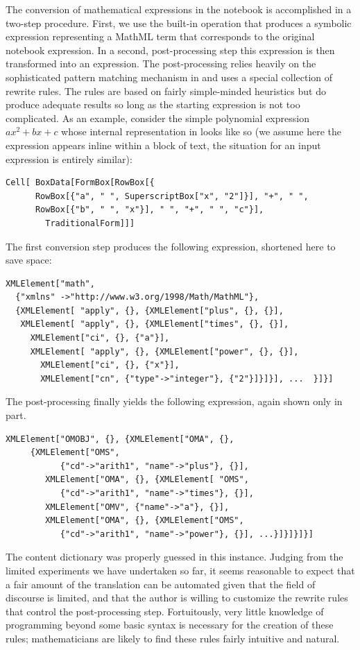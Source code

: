 The conversion of mathematical expressions in the notebook is accomplished in a two-step
procedure.  First, we use the built-in {\mathematica} operation
{} that produces a symbolic expression representing a
MathML term that corresponds to the original notebook expression.  In a second,
post-processing step this expression is then transformed into an {\openmath} expression.
The post-processing relies heavily on the sophisticated pattern matching mechanism in
{\mathematica} and uses a special collection of rewrite rules.  The rules are based on
fairly simple-minded heuristics but do produce adequate results so long as the starting
expression is not too complicated.  As an example, consider the simple polynomial
expression $a x^2 + b x + c$ whose internal representation in {\mathematica} looks like so
(we assume here the expression appears inline within a block of text, the situation for an
input expression is entirely similar):
\begin{lstlisting}
Cell[ BoxData[FormBox[RowBox[{ 
      RowBox[{"a", " ", SuperscriptBox["x", "2"]}], "+", " ", 
      RowBox[{"b", " ", "x"}], " ", "+", " ", "c"}], 
        TraditionalForm]]]
\end{lstlisting}
The first conversion step produces the following {\mathematica} expression, 
shortened here to save space:
\begin{lstlisting}
XMLElement["math", 
  {"xmlns" ->"http://www.w3.org/1998/Math/MathML"}, 
  {XMLElement[ "apply", {}, {XMLElement["plus", {}, {}], 
   XMLElement[ "apply", {}, {XMLElement["times", {}, {}], 
     XMLElement["ci", {}, {"a"}], 
     XMLElement[ "apply", {}, {XMLElement["power", {}, {}], 
       XMLElement["ci", {}, {"x"}], 
       XMLElement["cn", {"type"->"integer"}, {"2"}]}]}], ...  }]}]
\end{lstlisting}
The post-processing finally yields the 
following expression, again shown only in part. 
\begin{lstlisting}
XMLElement["OMOBJ", {}, {XMLElement["OMA", {}, 
     {XMLElement["OMS", 
           {"cd"->"arith1", "name"->"plus"}, {}],
        XMLElement["OMA", {}, {XMLElement[ "OMS", 
           {"cd"->"arith1", "name"->"times"}, {}], 
        XMLElement["OMV", {"name"->"a"}, {}], 
        XMLElement["OMA", {}, {XMLElement["OMS", 
           {"cd"->"arith1", "name"->"power"}, {}], ...}]}]}]}]
\end{lstlisting}

The content dictionary was properly guessed in this instance.  Judging from the limited
experiments we have undertaken so far, it seems reasonable to expect that a fair amount of
the translation can be automated given that the field of discourse is limited, and that
the author is willing to customize the rewrite rules that control the post-processing
step.  Fortuitously, very little knowledge of {\mathematica} programming beyond some basic
syntax is necessary for the creation of these rules; mathematicians are likely to find
these rules fairly intuitive and natural.

